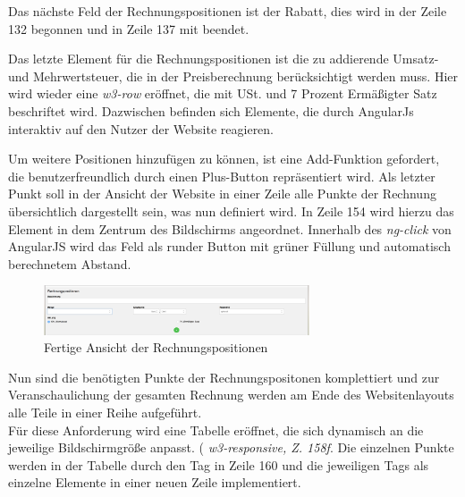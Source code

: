 

Das nächste Feld der Rechnungspositionen ist der Rabatt, dies wird in der Zeile 132 begonnen und in Zeile 137 mit  beendet.



Das letzte Element für die Rechnungspositionen ist die zu addierende Umsatz- und Mehrwertsteuer, die in der Preisberechnung berücksichtigt werden muss. 
Hier wird wieder eine \textit{w3-row} eröffnet, die mit USt. und 7 Prozent Ermäßigter Satz beschriftet wird. Dazwischen befinden sich Elemente, die durch AngularJs interaktiv auf den Nutzer der Website reagieren.



Um weitere Positionen hinzufügen zu können, ist eine Add-Funktion gefordert, die benutzerfreundlich durch einen Plus-Button repräsentiert wird. 
%
Als letzter Punkt soll in der Ansicht der Website in einer Zeile alle Punkte der Rechnung übersichtlich dargestellt sein, was nun definiert wird. In Zeile 154 wird hierzu das Element in dem Zentrum des Bildschirms angeordnet. Innerhalb des \textit{ng-click} von AngularJS wird das Feld als runder Button mit grüner Füllung und automatisch berechnetem Abstand. 



\begin{figure}[H]
    \centering
    \includegraphics[width=0.7\textwidth]{imports/Rechnungspositonen}
    \caption{ Fertige Ansicht der Rechnungspositionen}
\end{figure}
%
Nun sind die benötigten Punkte der Rechnungspositonen komplettiert und zur Veranschaulichung der gesamten Rechnung werden am Ende des Websitenlayouts alle Teile in einer Reihe aufgeführt. 
\\

Für diese Anforderung wird eine Tabelle eröffnet, die sich dynamisch an die jeweilige Bildschirmgröße anpasst. ( \textit{w3-responsive, Z. 158f}. Die einzelnen Punkte werden in der Tabelle durch den  Tag in Zeile 160 und die jeweiligen  Tags als einzelne Elemente in einer neuen Zeile implementiert.

